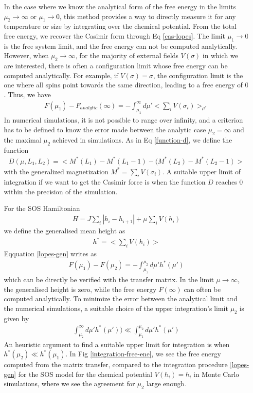 {In the case where we know the analytical form of the free energy in the limits $\mu_2 \to \infty$ or $\mu_1 \to 0$, this method provides a way to directly measure it for any temperature or size by integrating over the chemical potential.
From the total free energy, we recover the Casimir form through Eq \eqref{cas-lopes}.
The limit $\mu_1 \to 0$ is the free system limit, and the free energy can not be computed analytically. However, when $\mu_2 \to \infty$, for  the majority of external fields $V(\sigma)$ in which we are interested, there is often a configuration limit whose free energy can be computed analytically. For example, if $V(\sigma)=\sigma$, the configuration limit is the one where all spins point towards the same direction, leading to a free energy of $0$. Thus, we have
\begin{align}
   F(\mu_1) - F_{analytic}(\infty) = - \int_{\mu_1}^{\infty} d\mu'  < \sum_i V(\sigma_i) >_{\mu'} 
   \label{lopes-gen}
\end{align}
In numerical simulations, it is not possible to range over infinity, and a criterion has to be defined to know the error made between the analytic case $\mu_2 = \infty$ and the maximal $\mu_2$ achieved in simulations. As in Eq \eqref{function-d}, we define the function
\begin{align}
    D(\mu,L_1,L_2) =  < M^\ast(L_1)-M^\ast(L_1-1) - (M^\ast(L_2)-M^\ast(L_2-1) >
\end{align}
with the generalized magnetization $M^\ast = \sum_i V(\sigma_i)$. A suitable upper limit of integration if we want to get the Casimir force is when the function $D$ reaches $0$ within the precision of the simulation.


For the SOS Hamiltonian
\begin{align}
    H =  J \sum_i |h_i -h_{i+1}|  + \mu \sum_i V(h_i)
\end{align}
we define the generalised mean height as
\begin{align}
    h^\ast = < \sum_i V(h_i) >
\end{align}
Eqquation \eqref{lopes-gen} writes as
\begin{align}
   F(\mu_1) - F(\mu_2) = -  \int_{\mu_1}^{\mu_2} d\mu' h^\ast(\mu')
   \label{diff-gene}
\end{align}
which can be directly be verified with the transfer matrix. 
In the limit $\mu \to \infty$, the generalised height is zero, while the free energy $F(\infty)$ can often be computed analytically. 
To minimize the error between the analytical limit and the numerical simulations, a suitable choice of the upper integration's limit $\mu_2$ is given by
\begin{align}
    \int_{\mu_2}^\infty  d\mu' h^\ast(\mu')) \ll \int_{\mu_1}^{\mu_2}  d\mu' h^\ast(\mu')
\end{align}
An heuristic argument to find a suitable upper limit for integration is when $h^\ast(\mu_2) \ll h^\ast(\mu_1)$.
In Fig \ref{integration-free-ene}, we see the free energy computed from the matrix transfer, compared to the integration procedure \eqref{lopes-gen} for the SOS model for the chemical potential $V(h_i)=h_i$ in Monte Carlo simulations, where we see the agreement for $\mu_2$ large enough.

}
